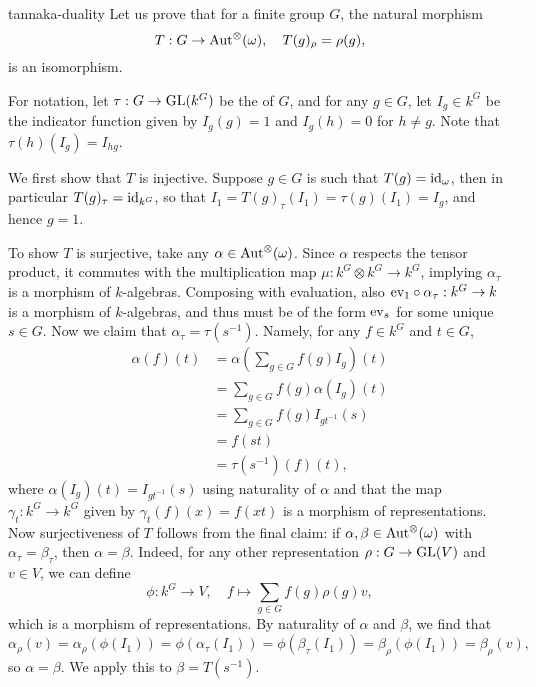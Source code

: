 \begin{example}{tannaka-duality}
    Let us prove that for a finite group $G$, the natural morphism
    \[ T : G \to \textup{Aut}^\otimes(\omega), \quad T(g)_\rho = \rho(g) , \]
    is an isomorphism.
    
    For notation, let $\tau : G \to \textup{GL}(k^G)$ be the  of $G$, and for any $g \in G$, let $I_g \in k^G$ be the indicator function given by $I_g(g) = 1$ and $I_g(h) = 0$ for $h \ne g$. Note that $\tau(h)(I_g) = I_{hg}$.
    
    We first show that $T$ is injective. Suppose $g \in G$ is such that $T(g) = \text{id}_\omega$, then in particular $T(g)_\tau = \text{id}_{k^G}$, so that $I_1 = T(g)_\tau(I_1) = \tau(g)(I_1) = I_g$, and hence $g = 1$.
    
    To show $T$ is surjective, take any $\alpha \in \textup{Aut}^\otimes(\omega)$. Since $\alpha$ respects the tensor product, it commutes with the multiplication map $\mu : k^G \otimes k^G \to k^G$, implying $\alpha_\tau$ is a morphism of $k$-algebras. Composing with evaluation, also $\textup{ev}_1 \circ \alpha_\tau : k^G \to k$ is a morphism of $k$-algebras, and thus must be of the form $\textup{ev}_s$ for some unique $s \in G$. Now we claim that $\alpha_\tau = \tau(s^{-1})$. Namely, for any $f \in k^G$ and $t \in G$,
    \[ \begin{aligned}
        \alpha(f)(t)
            &= \alpha \left( \sum_{g \in G} f(g) I_g \right) (t) \\
            &= \sum_{g \in G} f(g) \alpha(I_g) (t) \\
            &= \sum_{g \in G} f(g) I_{gt^{-1}}(s) \\
            &= f(st) \\
            &= \tau(s^{-1})(f)(t) ,
    \end{aligned} \]
    where $\alpha(I_g)(t) = I_{gt^{-1}}(s)$ using naturality of $\alpha$ and that the map $\gamma_t : k^G \to k^G$ given by $\gamma_t(f)(x) = f(xt)$ is a morphism of representations. Now surjectiveness of $T$ follows from the final claim: if $\alpha, \beta \in \textup{Aut}^\otimes(\omega)$ with $\alpha_\tau = \beta_\tau$, then $\alpha = \beta$. Indeed, for any other representation $\rho : G \to \textup{GL}(V)$ and $v \in V$, we can define
    \[ \phi : k^G \to V, \quad f \mapsto \sum_{g \in G} f(g) \rho(g) v , \]
    which is a morphism of representations. By naturality of $\alpha$ and $\beta$, we find that
    \[ \alpha_\rho(v) = \alpha_\rho(\phi(I_1)) = \phi(\alpha_\tau(I_1)) = \phi(\beta_\tau(I_1)) = \beta_\rho(\phi(I_1)) = \beta_\rho(v) , \]
    so $\alpha = \beta$. We apply this to $\beta = T(s^{-1})$.
\end{example}

